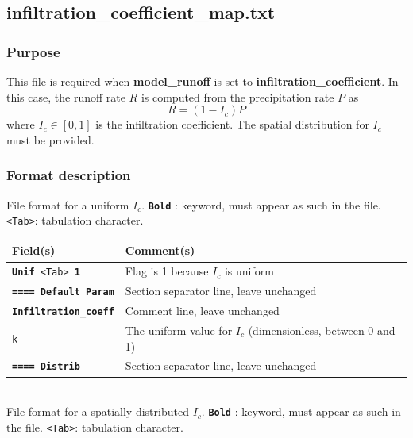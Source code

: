 \subsection{infiltration\_coefficient\_map.txt}
\subsubsection{Purpose}
This file is required when \textbf{model\_runoff} is set to \textbf{infiltration\_coefficient}. In this case, the runoff rate $R$ is computed from the precipitation rate $P$ as
\begin{equation}
R = (1 - I_c) P
\end{equation} where $I_c \in [0, 1]$ is the infiltration coefficient. The spatial distribution for $I_c$ must be provided.
%
\subsubsection{Format description}
File format for a uniform $I_c$.  
\texttt{\textbf{Bold}} : keyword, must appear as such in the file. \texttt{<Tab>}: tabulation character. \\
    \begin{tabular}{p{6cm} | p{9cm}}
    \hline
    Field(s) & Comment(s) \\
    \hline  \hline
    \texttt{\textbf{Unif} <Tab> \textbf{1}} & Flag is 1 because $I_c$ is uniform \\ 
    \hline
    \texttt{\textbf{==== Default Param}} & Section separator line, leave unchanged \\
    \hline
    \texttt{\textbf{Infiltration\_coeff}} & Comment line, leave unchanged \\  
    \hline
    \texttt{k} & The uniform value for $I_c$ (dimensionless, between 0 and 1) \\ 
    \hline
    \texttt{\textbf{==== Distrib}} & Section separator line, leave unchanged \\  
    \hline
    \end{tabular}
%
\vspace{10mm} \\
%
File format for a spatially distributed $I_c$.  
\texttt{\textbf{Bold}} : keyword, must appear as such in the file. \texttt{<Tab>}: tabulation character. \\
